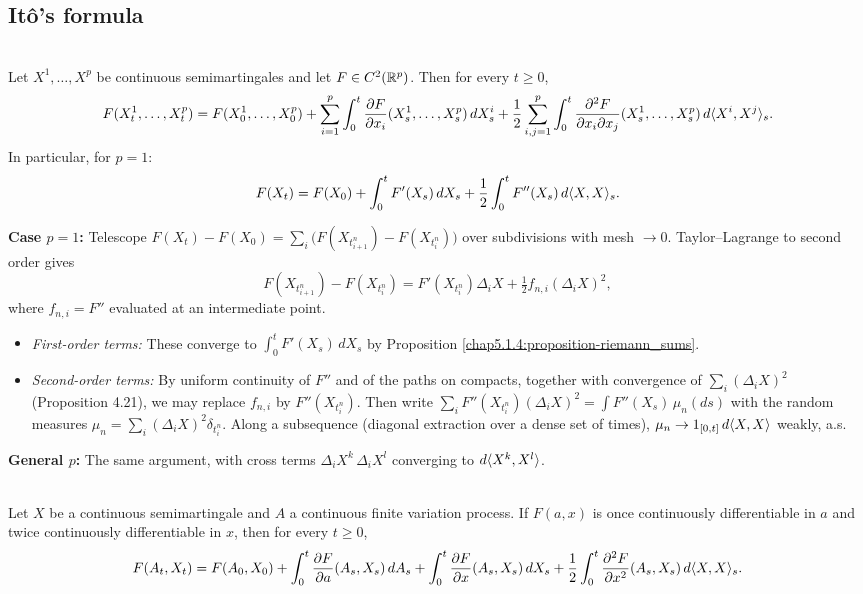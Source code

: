 \subsection{Itô's formula}

\begin{theorem}\label{chap5.2:theorem-ito_formula}
\\
Let $X^1,\dots,X^p$ be continuous semimartingales and let $F\in C^2(\mathbb{R}^p)$. Then for every $t\geq0$,
$$F(X^1_t,\dots,X^p_t)=F(X^1_0,\dots,X^p_0)+\sum_{i=1}^p\int_0^t\frac{\partial F}{\partial x_i}(X^1_s,\dots,X^p_s)\,dX^i_s+\frac12\sum_{i,j=1}^p\int_0^t\frac{\partial^2F}{\partial x_i\partial x_j}(X^1_s,\dots,X^p_s)\,d\langle X^i,X^j\rangle_s.$$
In particular, for $p=1$:
$$F(X_t)=F(X_0)+\int_0^tF'(X_s)\,dX_s+\frac12\int_0^tF''(X_s)\,d\langle X,X\rangle_s.$$
\end{theorem}

\begin{proofidea}
\textbf{Case $p=1$:} Telescope $F(X_t)-F(X_0)=\sum_i\big(F(X_{t^n_{i+1}})-F(X_{t^n_i})\big)$ over subdivisions with mesh $\to0$. Taylor--Lagrange to second order gives
$$F(X_{t^n_{i+1}})-F(X_{t^n_i})=F'(X_{t^n_i})\Delta_iX+\tfrac12 f_{n,i}(\Delta_iX)^2,$$
where $f_{n,i}=F''$ evaluated at an intermediate point.
\begin{itemize}
    \item \textit{First-order terms:} These converge to $\int_0^tF'(X_s)\,dX_s$ by Proposition \ref{chap5.1.4:proposition-riemann_sums}.
    \item \textit{Second-order terms:} By uniform continuity of $F''$ and of the paths on compacts, together with convergence of $\sum_i(\Delta_iX)^2$ (Proposition 4.21), we may replace $f_{n,i}$ by $F''(X_{t^n_i})$. Then write $\sum_iF''(X_{t^n_i})(\Delta_iX)^2=\int F''(X_s)\,\mu_n(ds)$ with the random measures $\mu_n=\sum_i(\Delta_iX)^2\delta_{t^n_i}$. Along a subsequence (diagonal extraction over a dense set of times), $\mu_n\to 1_{[0,t]}\,d\langle X,X\rangle$ weakly, a.s.
\end{itemize}

\textbf{General $p$:} The same argument, with cross terms $\Delta_iX^k\,\Delta_iX^l$ converging to $d\langle X^k,X^l\rangle$.
\end{proofidea}

\begin{corollary}\label{chap5.2:corollary-ito_fv_argument}
\\
Let $X$ be a continuous semimartingale and $A$ a continuous finite variation process. If $F(a,x)$ is once continuously differentiable in $a$ and twice continuously differentiable in $x$, then for every $t\geq0$,
$$F(A_t,X_t)=F(A_0,X_0)+\int_0^t\frac{\partial F}{\partial a}(A_s,X_s)\,dA_s+\int_0^t\frac{\partial F}{\partial x}(A_s,X_s)\,dX_s+\frac12\int_0^t\frac{\partial^2F}{\partial x^2}(A_s,X_s)\,d\langle X,X\rangle_s.$$
\end{corollary}

